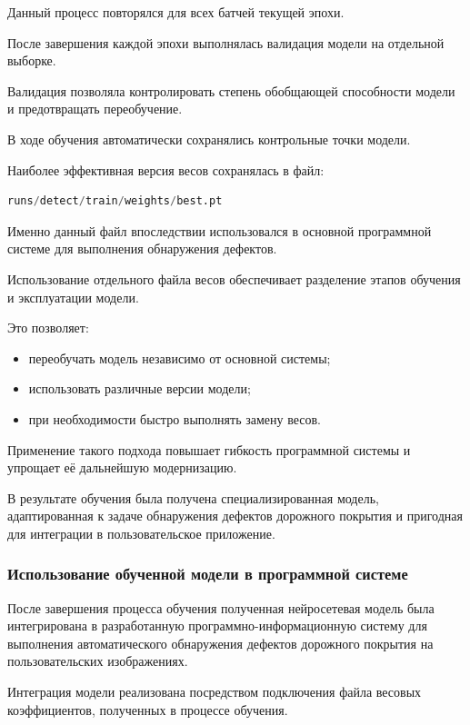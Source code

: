 Данный процесс повторялся для всех батчей текущей эпохи.

После завершения каждой эпохи выполнялась валидация модели на отдельной выборке.

Валидация позволяла контролировать степень обобщающей способности модели и предотвращать переобучение.

В ходе обучения автоматически сохранялись контрольные точки модели.

Наиболее эффективная версия весов сохранялась в файл:

\begin{lstlisting}[language=Python]
	runs/detect/train/weights/best.pt
\end{lstlisting}

Именно данный файл впоследствии использовался в основной программной системе для выполнения обнаружения дефектов.

Использование отдельного файла весов обеспечивает разделение этапов обучения и эксплуатации модели.

Это позволяет:

\begin{itemize}
	\item переобучать модель независимо от основной системы;
	\item использовать различные версии модели;
	\item при необходимости быстро выполнять замену весов.
\end{itemize}

Применение такого подхода повышает гибкость программной системы и упрощает её дальнейшую модернизацию.

В результате обучения была получена специализированная модель, адаптированная к задаче обнаружения дефектов дорожного покрытия и пригодная для интеграции в пользовательское приложение.

\subsubsection{Использование обученной модели в программной системе}

После завершения процесса обучения полученная нейросетевая модель была интегрирована в разработанную программно-информационную систему для выполнения автоматического обнаружения дефектов дорожного покрытия на пользовательских изображениях.

Интеграция модели реализована посредством подключения файла весовых коэффициентов, полученных в процессе обучения.

